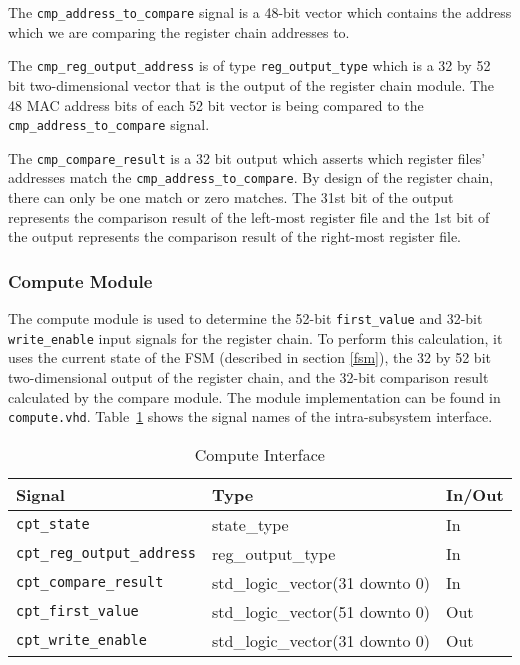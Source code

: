 \documentclass{article}
\begin{document}
The \texttt{cmp\_address\_to\_compare} signal is a 48-bit vector which contains the address which we are comparing the register chain addresses to. 

The \texttt{cmp\_reg\_output\_address} is of type \texttt{reg\_output\_type} which is a 32 by 52 bit two-dimensional vector that is the output of the register chain module. The 48 MAC address bits of each 52 bit vector is being compared to the \texttt{cmp\_address\_to\_compare} signal. 

The \texttt{cmp\_compare\_result} is a 32 bit output which asserts which register files' addresses match the \texttt{cmp\_address\_to\_compare}. By design of the register chain, there can only be one match or zero matches. The 31st bit of the output represents the comparison result of the left-most register file and the 1st bit of the output represents the comparison result of the right-most register file.

\subsubsection{Compute Module}

The compute module is used to determine the 52-bit \texttt{first\_value} and 32-bit \texttt{write\_enable} input signals for the register chain. To perform this calculation, it uses the current state of the FSM (described in section \ref{fsm}), the 32 by 52 bit two-dimensional output of the register chain, and the 32-bit comparison result calculated by the compare module. The module implementation can be found in \texttt{compute.vhd}. Table~\ref{tab:compute} shows the signal names of the intra-subsystem interface. 

\begin{table}[ht]
    \begin{center}
        \begin{tabular}{lll}\hline
        Signal & Type & In/Out \\
        \hline
        \texttt{cpt\_state} & state\_type & In \\
        \hline
        \texttt{cpt\_reg\_output\_address} & reg\_output\_type & In \\
        \hline
        \texttt{cpt\_compare\_result} & std\_logic\_vector(31 downto 0) & In \\
        \hline
        \texttt{cpt\_first\_value} & std\_logic\_vector(51 downto 0) & Out \\
        \hline
        \texttt{cpt\_write\_enable} & std\_logic\_vector(31 downto 0) & Out \\
        \hline
        \end{tabular}
        \caption{Compute Interface}\label{tab:compute}
    \end{center}
\end{table}
\end{document}
